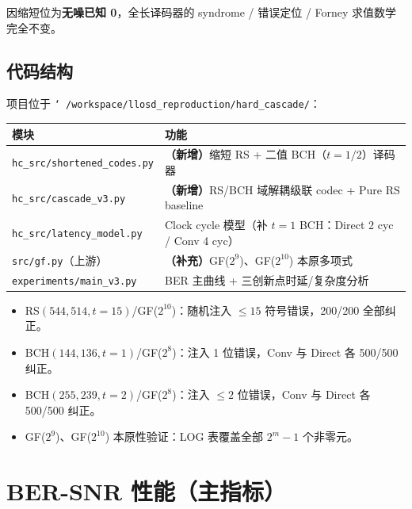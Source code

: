 \documentclass[11pt,a4paper]{article}
\begin{document}
因缩短位为\textbf{无噪已知 0}，全长译码器的 syndrome / 错误定位 / Forney 求值数学完全不变。

\subsection{代码结构}

项目位于 \texttt{\char`~/workspace/llosd\_reproduction/hard\_cascade/}：

\begin{table}[!ht]
\centering
\begin{tabular}{ll}
\toprule
模块 & 功能 \\
\midrule
\texttt{hc\_src/shortened\_codes.py} & \textbf{（新增）}缩短 RS + 二值 BCH（$t{=}1/2$）译码器 \\
\texttt{hc\_src/cascade\_v3.py}      & \textbf{（新增）}RS/BCH 域解耦级联 codec + Pure RS baseline \\
\texttt{hc\_src/latency\_model.py}   & Clock cycle 模型（补 $t{=}1$ BCH：Direct 2 cyc / Conv 4 cyc）\\
\texttt{src/gf.py}（上游）           & \textbf{（补充）}GF($2^{9}$)、GF($2^{10}$) 本原多项式 \\
\texttt{experiments/main\_v3.py}     & BER 主曲线 + 三创新点时延/复杂度分析 \\
\bottomrule
\end{tabular}
\end{table}

\begin{keybox}[title=\textbf{正确性冒烟测试（已通过）}]
\begin{itemize}[leftmargin=1.5em, itemsep=1pt]
\item RS$(544,514,t{=}15)$/GF($2^{10}$)：随机注入 $\leq 15$ 符号错误，200/200 全部纠正。
\item BCH$(144,136,t{=}1)$/GF($2^{8}$)：注入 1 位错误，Conv 与 Direct 各 500/500 纠正。
\item BCH$(255,239,t{=}2)$/GF($2^{8}$)：注入 $\leq 2$ 位错误，Conv 与 Direct 各 500/500 纠正。
\item GF($2^{9}$)、GF($2^{10}$) 本原性验证：LOG 表覆盖全部 $2^m{-}1$ 个非零元。
\end{itemize}
\end{keybox}

\section{BER-SNR 性能（主指标）}
\end{document}
